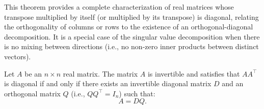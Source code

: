 \documentclass[
	11pt, %
	fleqn, %
	a4paper, %
]{LegrandOrangeBook}
\begin{document}
This theorem provides a complete characterization of real matrices whose transpose multiplied by itself (or multiplied by its transpose) is diagonal, relating the orthogonality of columns or rows to the existence of an orthogonal-diagonal decomposition. It is a special case of the singular value decomposition when there is no mixing between directions (i.e., no non-zero inner products between distinct vectors).



\begin{theorem}
Let \(A\) be an \(n \times n\) real matrix. The matrix \(A\) is invertible and satisfies that \(A A^\top\) is diagonal if and only if there exists an invertible diagonal matrix \(D\) and an orthogonal matrix \(Q\) (i.e., \(Q Q^\top = I_n\)) such that:
\[
A = D Q.
\]
\end{theorem}
\end{document}
